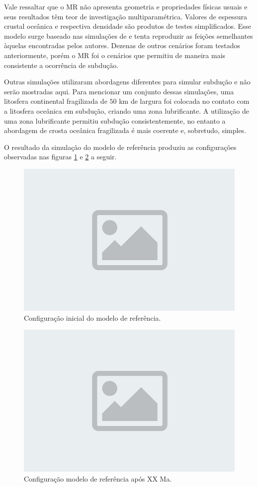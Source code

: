  

Vale ressaltar que o MR não apresenta geometria e propriedades físicas usuais e seus resultados têm teor de investigação multiparamétrica. Valores de espessura crustal oceânica e respectiva densidade são produtos de testes simplificados. Esse modelo surge baseado nas simulações de \citet{strak2021thermo} e tenta reproduzir as feições semelhantes àquelas encontradas pelos autores. Dezenas de outros cenários foram testados anteriormente, porém o MR foi o cenários que permitiu de maneira mais consistente a ocorrência de subdução. 

Outras simulações utilizaram abordagens diferentes para simular subdução e não serão mostradas aqui. Para mencionar um conjunto dessas simulações, uma litosfera continental fragilizada de $50$ km de largura foi colocada no contato com a litosfera oceânica em subdução, criando uma zona lubrificante. A utilização de uma zona lubrificante permitiu subdução consistentemente, no entanto a abordagem de crosta oceânica fragilizada é mais coerente e, sobretudo, simples.

O resultado da simulação do modelo de referência produziu as configurações observadas nas figuras \ref{fig:inicio-referencia} e \ref{fig:fim-referencia} a seguir.

\begin{figure}
    \centering
    \includegraphics[width=0.6 \textwidth]{fig/placeholder.jpeg}
    \caption{Configuração inicial do modelo de referência.}
    \label{fig:inicio-referencia}
\end{figure}

\begin{figure}
    \centering
    \includegraphics[width=0.6 \textwidth]{fig/placeholder.jpeg}
    \caption{Configuração modelo de referência após XX Ma.}
    \label{fig:fim-referencia}
\end{figure}

